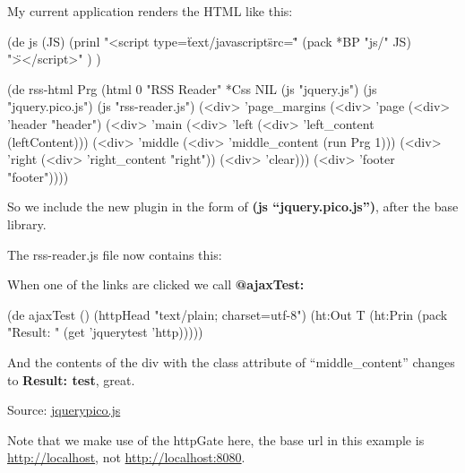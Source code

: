 My current application renders the HTML like this:

\begin{wideverbatim}
(de js (JS)
   (prinl "<script type=\"text/javascript\" src=\""
      (pack *BP "js/" JS) "\"></script>" ) )

(de rss-html Prg
   (html 0 "RSS Reader" *Css NIL
      (js "jquery.js")
      (js "jquery.pico.js")
      (js "rss-reader.js")
      (<div> 'page_margins
         (<div> 'page 
            (<div> 'header "header")
            (<div> 'main
               (<div> 'left 
                  (<div> 'left_content (leftContent)))
               (<div> 'middle 
                  (<div> 'middle_content (run Prg 1)))
               (<div> 'right 
                  (<div> 'right_content "right"))
               (<div> 'clear)))
         (<div> 'footer "footer"))))
\end{wideverbatim}

So we include the new plugin in the form of \textbf{(js ``jquery.pico.js'')},
after the base library.

The rss-reader.js file now contains this:



When one of the links are clicked we call \textbf{@ajaxTest:}


\begin{wideverbatim}
(de ajaxTest ()
  (httpHead "text/plain; charset=utf-8")
  (ht:Out T
     (ht:Prin (pack "Result: " (get 'jquerytest 'http)))))
\end{wideverbatim}

And the contents of the div with the class attribute of
``middle\_content'' changes to \textbf{Result: test}, great.

Source:
\href{http://www.prodevtips.com/wp-content/uploads/2008/10/jquerypico.js}{jquerypico.js}

Note that we make use of the httpGate here, the base url in this example
is \href{http://localhost}{http://localhost}, not \href{http://localhost:8080}{http://localhost:8080}.
